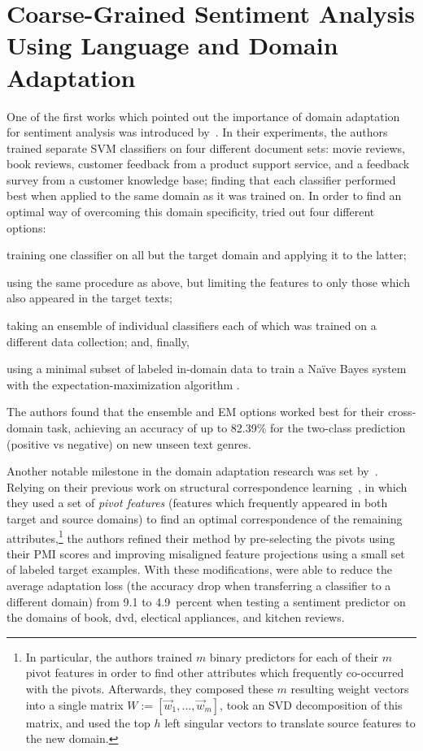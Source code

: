 \section{Coarse-Grained Sentiment Analysis Using Language and Domain
  Adaptation}\label{sec:cgsa:domain-adaptation}

One of the first works which pointed out the importance of domain
adaptation for sentiment analysis was introduced by~\citet{Aue:05}.
In their experiments, the authors trained separate SVM classifiers on
four different document sets: movie reviews, book reviews, customer
feedback from a product support service, and a feedback survey from a
customer knowledge base; finding that each classifier performed best
when applied to the same domain as it was trained on.  In order to
find an optimal way of overcoming this domain specificity,
\citet{Aue:05} tried out four different options:
\begin{inparaenum}[(i)]
\item\label{sent-cgsa:lst:rel-wrk1} training one classifier on all but
  the target domain and applying it to the latter;
\item using the same procedure as above, but limiting the features to
  only those which also appeared in the target texts;
\item taking an ensemble of individual classifiers each of which was
  trained on a different data collection; and, finally,
\item using a minimal subset of labeled in-domain data to train a
  Na{\"i}ve Bayes system with the expectation-maximization algorithm
  \cite[EM;][]{Dempster:77}.
\end{inparaenum}
The authors found that the ensemble and EM options worked best for
their cross-domain task, achieving an accuracy of up to 82.39\% for
the two-class prediction (positive vs negative) on new unseen text
genres.

Another notable milestone in the domain adaptation research was set
by~\citet{Blitzer:07}.  Relying on their previous work on structural
correspondence learning~\cite{Blitzer:07}, in which they used a set of
\emph{pivot features} (features which frequently appeared in both
target and source domains) to find an optimal correspondence of the
remaining attributes,\footnote{In particular, the authors trained $m$
  binary predictors for each of their $m$ pivot features in order to
  find other attributes which frequently co-occurred with the pivots.
  Afterwards, they composed these $m$ resulting weight vectors into a
  single matrix $W := [\vec{w}_{1},\ldots,\vec{w}_{m}]$, took an SVD
  decomposition of this matrix, and used the top $h$ left singular
  vectors to translate source features to the new domain.} the authors
refined their method by pre-selecting the pivots using their PMI
scores and improving misaligned feature projections using a small set
of labeled target examples.  With these modifications,
\citeauthor{Blitzer:07} were able to reduce the average adaptation
loss (the accuracy drop when transferring a classifier to a different
domain) from 9.1 to 4.9~percent when testing a sentiment predictor on
the domains of book, dvd, electical appliances, and kitchen reviews.

